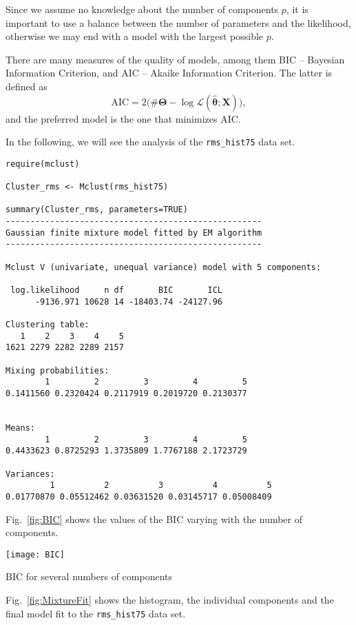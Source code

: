 Since we assume no knowledge about the number of components $p$, it is important to use a balance between the number of parameters and the likelihood, otherwise we may end with a model with the largest possible $p$.

There are many measures of the quality of models, among them BIC -- Bayesian Information Criterion, and AIC -- Akaike Information Criterion.
The latter is defined as
$$
\text{AIC} = 2\big(\#\bm\Theta - \log \mathcal L(\widehat{\bm{\theta}};\bm X)\big),
$$
and the preferred model is the one that minimizes AIC.

In the following, we will see the analysis of the \verb|rms_hist75| data set.

\begin{lstlisting}[frame=lines]
require(mclust)

Cluster_rms <- Mclust(rms_hist75)

summary(Cluster_rms, parameters=TRUE)
----------------------------------------------------
Gaussian finite mixture model fitted by EM algorithm 
----------------------------------------------------

Mclust V (univariate, unequal variance) model with 5 components:

 log.likelihood     n df       BIC       ICL
      -9136.971 10628 14 -18403.74 -24127.96

Clustering table:
   1    2    3    4    5 
1621 2279 2282 2289 2157 

Mixing probabilities:
        1         2         3         4         5 
0.1411560 0.2320424 0.2117919 0.2019720 0.2130377 


Means:
        1         2         3         4         5 
0.4433623 0.8725293 1.3735809 1.7767188 2.1723729 

Variances:
         1          2          3          4          5 
0.01770870 0.05512462 0.03631520 0.03145717 0.05008409 
\end{lstlisting}

Fig.~\ref{fig:BIC} shows the values of the BIC varying with the number of components.

\begin{marginfigure}
\centering
\texttt{[image: BIC]}
\caption{BIC for several numbers of components}
\label{fig:BIC}
\end{marginfigure}

Fig.~\ref{fig:MixtureFit} shows the histogram, the individual components and the final model fit to the \verb|rms_hist75| data set.

